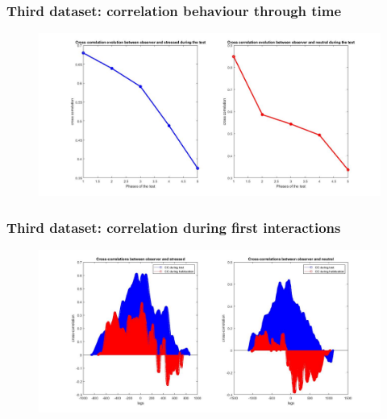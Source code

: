 \documentclass{beamer}
\begin{document}
\begin{frame}
\frametitle{Third dataset: correlation behaviour through time}


\begin{figure}[H]
	\begin{center}
		\hspace*{-1cm}
		\includegraphics[scale=.28]{corr_time3.jpg} 
	\end{center}  
	
	
\end{figure}

\end{frame}

\begin{frame}
\frametitle{Third dataset: correlation during first interactions}


\begin{figure}[H]
	\begin{center}
		\hspace*{-1cm}
		\includegraphics[scale=.28]{corr_reduced_times3.jpg} 
	\end{center}  
	
	
\end{figure}

\end{frame}
\end{document}
